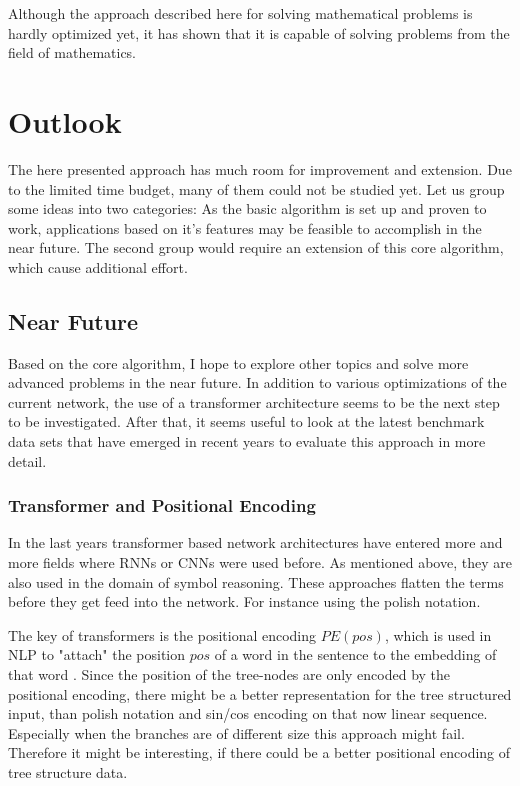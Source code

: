\documentclass{scrartcl}
\theoremstyle{definition}
\begin{document}
Although the approach described here for solving mathematical problems is hardly optimized yet,
it has shown that it is capable of solving problems from the field of mathematics.


\section{Outlook}

The here presented approach has much room for improvement and extension.
Due to the limited time budget, many of them could not be studied yet.
Let us group some ideas into two categories:
As the basic algorithm is set up and proven to work, applications based on it's features may be feasible to accomplish in the near future.
The second group would require an extension of this core algorithm, which cause additional effort.

\subsection{Near Future}

Based on the core algorithm, I hope to explore other topics and solve more advanced problems in the near future.
In addition to various optimizations of the current network, the use of a transformer architecture seems to be the next step to be investigated.
After that, it seems useful to look at the latest benchmark data sets that have emerged in recent years to evaluate this approach in more detail.

\subsubsection{Transformer and Positional Encoding}

In the last years transformer based network architectures have entered more and more fields where RNNs or CNNs were used before.
As mentioned above, they are also used in the domain of symbol reasoning.
These approaches flatten the terms before they get feed into the network.
For instance using the polish notation.

The key of transformers is the positional encoding $PE\left( pos\right)$, which is used in NLP to "attach" the position $pos$ of a word in the sentence to the embedding of that word \cite{vaswani2017attention}.
Since the position of the tree-nodes are only encoded by the positional encoding, there might be a better representation for the tree structured input,
than polish notation and sin/cos encoding on that now linear sequence.
Especially when the branches are of different size this approach might fail.
Therefore it might be interesting, if there could be a better positional encoding of tree structure data.
\end{document}
